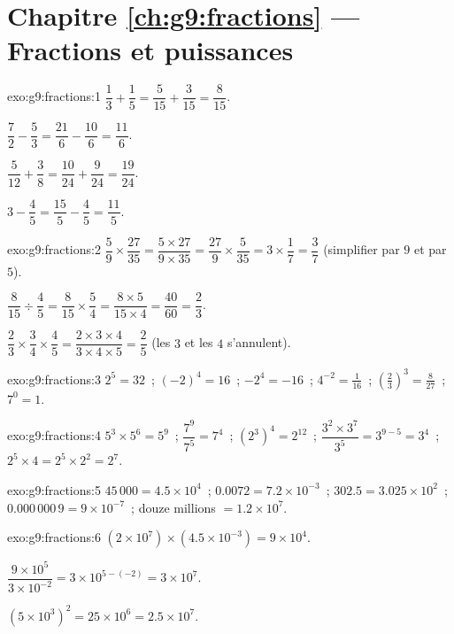 \section*{Chapitre \ref{ch:g9:fractions} --- Fractions et puissances}

\begin{solution}{exo:g9:fractions:1}
$\dfrac13 + \dfrac15 = \dfrac{5}{15} + \dfrac{3}{15} = \dfrac{8}{15}$.

$\dfrac72 - \dfrac53 = \dfrac{21}{6} - \dfrac{10}{6} = \dfrac{11}{6}$.

$\dfrac{5}{12} + \dfrac38 = \dfrac{10}{24} + \dfrac{9}{24} =
\dfrac{19}{24}$.

$3 - \dfrac45 = \dfrac{15}{5} - \dfrac45 = \dfrac{11}{5}$.
\end{solution}

\begin{solution}{exo:g9:fractions:2}
$\dfrac59 \times \dfrac{27}{35} = \dfrac{5 \times 27}{9 \times 35}
= \dfrac{27}{9} \times \dfrac{5}{35} = 3 \times \dfrac17 = \dfrac37$
(simplifier par $9$ et par $5$).

$\dfrac{8}{15} \div \dfrac45 = \dfrac{8}{15} \times \dfrac54
= \dfrac{8 \times 5}{15 \times 4} = \dfrac{40}{60} = \dfrac23$.

$\dfrac23 \times \dfrac34 \times \dfrac45 = \dfrac{2 \times 3 \times 4}
{3 \times 4 \times 5} = \dfrac25$ (les $3$ et les $4$ s'annulent).
\end{solution}

\begin{solution}{exo:g9:fractions:3}
$2^5 = 32$~; \quad $(-2)^4 = 16$~; \quad $-2^4 = -16$~; \quad
$4^{-2} = \frac{1}{16}$~; \quad
$\left(\frac23\right)^3 = \frac{8}{27}$~; \quad $7^0 = 1$.
\end{solution}

\begin{solution}{exo:g9:fractions:4}
$5^3 \times 5^6 = 5^9$~; \quad $\dfrac{7^9}{7^5} = 7^4$~; \quad
$\left(2^3\right)^4 = 2^{12}$~; \quad
$\dfrac{3^2 \times 3^7}{3^5} = 3^{9-5} = 3^4$~; \quad
$2^5 \times 4 = 2^5 \times 2^2 = 2^7$.
\end{solution}

\begin{solution}{exo:g9:fractions:5}
$45\,000 = 4.5 \times 10^4$~; \quad
$0.0072 = 7.2 \times 10^{-3}$~; \quad
$302.5 = 3.025 \times 10^2$~; \quad
$0.000\,000\,9 = 9 \times 10^{-7}$~; \quad
douze millions $= 1.2 \times 10^7$.
\end{solution}

\begin{solution}{exo:g9:fractions:6}
$(2 \times 10^7) \times (4.5 \times 10^{-3}) = 9 \times 10^{4}$.

$\dfrac{9 \times 10^5}{3 \times 10^{-2}} = 3 \times 10^{5 - (-2)}
= 3 \times 10^7$.

$(5 \times 10^3)^2 = 25 \times 10^6 = 2.5 \times 10^7$.
\end{solution}

